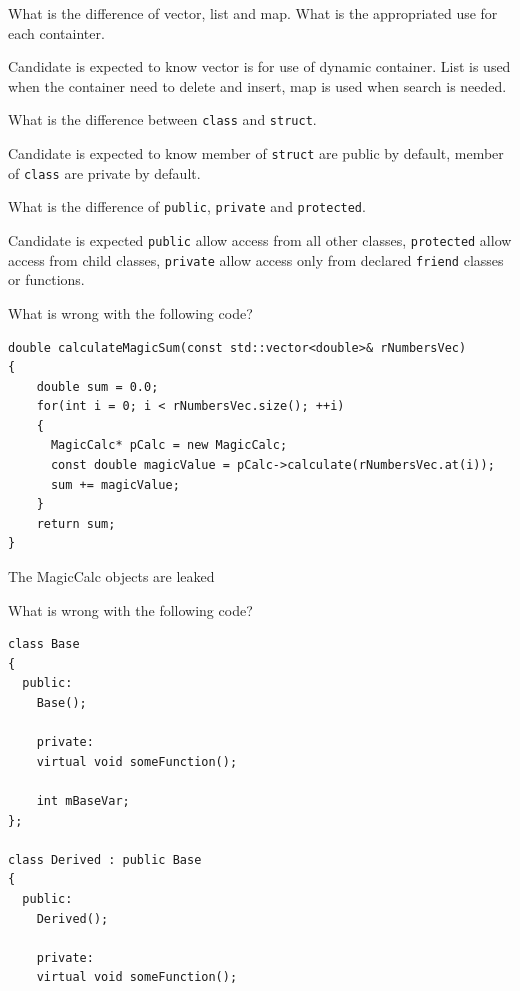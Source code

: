 \documentclass{exam}
\begin{document}
\begin{questions}
\question What is the difference of vector, list and map. What is the appropriated use for each containter.
\begin{solution}[.2in]
Candidate is expected to know vector is for use of dynamic container. List is used when the container need to delete and insert, map is used when search is needed.
\end{solution}

\question What is the difference between \lstinline{class} and \lstinline{struct}.
\begin{solution}[.2in]
Candidate is expected to know member of \lstinline{struct} are public by default, member of \lstinline{class} are private by default.
\end{solution}

\question What is the difference of \lstinline{public}, \lstinline{private} and \lstinline{protected}.
\begin{solution}[.2in]
Candidate is expected \lstinline{public} allow access from all other classes, \lstinline{protected} allow access from child classes, \lstinline{private} allow access only from declared \lstinline{friend} classes or functions.
\end{solution}

\question What is wrong with the following code?
\begin{lstlisting}
double calculateMagicSum(const std::vector<double>& rNumbersVec)
{
    double sum = 0.0;
    for(int i = 0; i < rNumbersVec.size(); ++i)
    {
      MagicCalc* pCalc = new MagicCalc;
      const double magicValue = pCalc->calculate(rNumbersVec.at(i));
      sum += magicValue;
    }
    return sum;
}
\end{lstlisting}
\begin{solution}[.2in]
The MagicCalc objects are leaked
\end{solution}

\question What is wrong with the following code?
\begin{lstlisting}
class Base
{
  public:
	Base();
	
	private:
	virtual void someFunction();
	
	int mBaseVar;
};

class Derived : public Base
{
  public:
	Derived();
	
	private:
	virtual void someFunction();
	

\end{lstlisting}
\end{questions}
\end{document}
